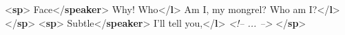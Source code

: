 \begin{shaded}
{<\textbf{sp}>}\mbox{}\newline 
{}Face{</\textbf{speaker}>}\mbox{}\newline 
{}Why! Who{</\textbf{l}>}\mbox{}\newline 
{}Am I, my mongrel? Who am I?{</\textbf{l}>}\mbox{}\newline 
{</\textbf{sp}>}\mbox{}\newline 
{<\textbf{sp}>}\mbox{}\newline 
{}Subtle{</\textbf{speaker}>}\mbox{}\newline 
{}I'll tell you,{</\textbf{l}>}\mbox{}\newline 
\textit{<!-- ... -->}\mbox{}\newline 
{</\textbf{sp}>}\end{shaded}\egroup\par \par
